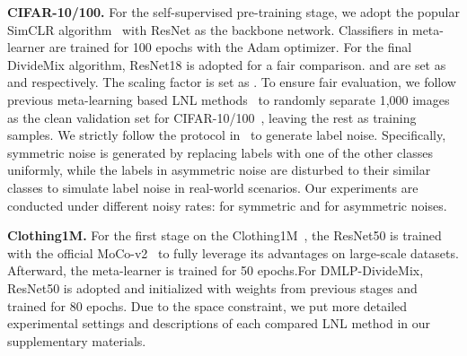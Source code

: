 \documentclass[10pt,twocolumn,letterpaper]{article}
\begin{document}
\textbf{CIFAR-10/100.} For the self-supervised pre-training stage, we adopt the popular SimCLR algorithm~\cite{chen2020simple} with ResNet as the backbone network. Classifiers in meta-learner are trained for 100 epochs with the Adam optimizer. For the final DivideMix algorithm, ResNet18 is adopted for a fair comparison.  and  are set as  and  respectively. The scaling factor  is set as .
To ensure fair evaluation, we follow previous meta-learning based LNL methods~\cite{AAAI-2021-meta,shu2019meta} to randomly separate 1,000 images as the clean validation set for CIFAR-10/100~\cite{datasetcifar10}, {leaving the rest as training samples}. We strictly follow {the protocol in}~\cite{Co-han2018co} to generate label noise. Specifically, symmetric noise is generated by replacing labels with one of the other classes uniformly, while the labels in asymmetric noise are disturbed to their similar classes to simulate label noise in real-world scenarios. {Our experiments are conducted under different noisy rates}:  for symmetric and  for asymmetric noises.

\textbf{Clothing1M.} For the first stage on the Clothing1M~\cite{xiao2015learning}, the ResNet50 is trained with the official MoCo-v2~\cite{2020MoCo-v2} to fully leverage its advantages on large-scale datasets. Afterward, the {meta-learner is} trained for 50 epochs.{For DMLP-DivideMix}, ResNet50 is adopted and initialized with weights from previous stages and trained for 80 epochs.
Due to the space constraint, we put more detailed experimental settings and descriptions of each compared LNL method in our supplementary materials.
\end{document}
